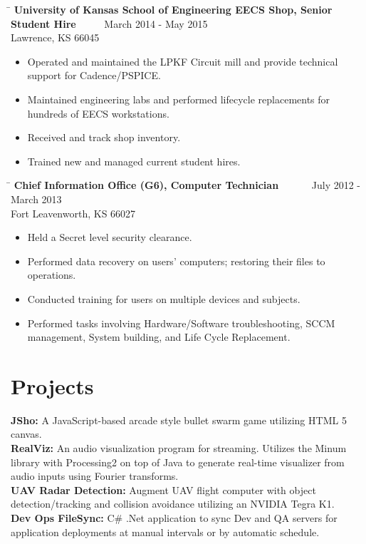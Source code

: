 \documentclass{res}
\begin{document}
\begin{resume}
\begin{itemize}
	\end{itemize}
   \begin{tabbing}
   \hspace{5.5in}\= \kill
   {\bf University of Kansas School of Engineering EECS Shop, Senior Student Hire}  \>~~~~~March 2014 - May 2015\\
   Lawrence, KS 66045
   \end{tabbing}\vspace{-10pt}
	\begin{itemize}
		\item Operated and maintained the LPKF Circuit mill and provide technical support for Cadence/PSPICE.
		\item Maintained engineering labs and performed lifecycle replacements for hundreds of EECS workstations.
		\item Received and track shop inventory.
		\item Trained new and managed current student hires.\vspace{-15pt}
	\end{itemize}
   \begin{tabbing}
	\hspace{5.5in}\= \kill
	{\bf Chief Information Office (G6), Computer Technician}  \>~~~~~~July 2012 - March 2013\\
	Fort Leavenworth, KS 66027
\end{tabbing}\vspace{-10pt}
	\begin{itemize}
		\item Held a Secret level security clearance.
		\item Performed data recovery on users' computers; restoring their files to operations.
		\item Conducted training for users on multiple devices and subjects.
		\item Performed tasks involving Hardware/Software troubleshooting, SCCM management, System building, and Life Cycle Replacement.\vspace{-10pt}
	\end{itemize}

\section{Projects}          
{\textbf{JSho:} A JavaScript-based arcade style bullet swarm game utilizing HTML 5 canvas.\\\textbf{RealViz:} An audio visualization program for streaming. Utilizes the Minum library with Processing2 on top of Java to generate real-time visualizer from audio inputs using Fourier transforms.\\\textbf{UAV Radar Detection:} Augment UAV flight computer with object detection/tracking and collision avoidance utilizing an NVIDIA Tegra K1.\\\textbf{Dev Ops FileSync:} C\# .Net application to sync Dev and QA servers for application deployments at manual intervals or by automatic schedule.}
 
\end{resume}
\end{document}
